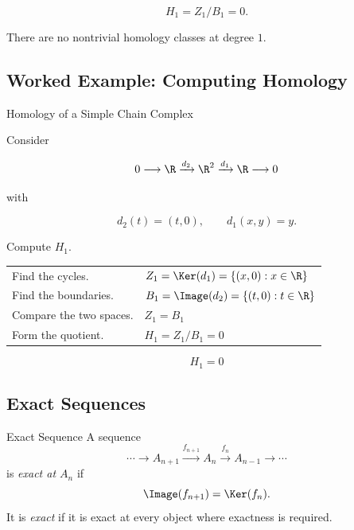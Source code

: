 \[ H_1=Z_1/B_1=0. \]

There are no nontrivial homology classes at degree \(1\).

\subsection{Worked Example: Computing Homology}
\label{subsec:worked-computing-homology}

\begin{workedexamplebox}{Homology of a Simple Chain Complex}

Consider

\[ 0\longrightarrow\R
\xrightarrow{d_2}\R^2
\xrightarrow{d_1}\R
\longrightarrow0 \]

with

\[ d_2(t)=(t,0),\qquad d_1(x,y)=y. \]

Compute \(H_1\).

\begin{tabularx}{\textwidth}{@{}>{\raggedright\arraybackslash}p{}X@{}}
Find the cycles. &
\(\displaystyle Z_1=\Ker(d_1)=\{(x,0):x\in\R\}\)\\
Find the boundaries. &
\(\displaystyle B_1=\Image(d_2)=\{(t,0):t\in\R\}\)\\
Compare the two spaces. & \(Z_1=B_1\)\\
Form the quotient. & \(H_1=Z_1/B_1=0\)
\end{tabularx}

\begin{answerbox}
\[ \boxed{H_1=0} \]
\end{answerbox}
\end{workedexamplebox}

\subsection{Exact Sequences}
\label{subsec:exact-sequences}

\begin{definitionbox}{Exact Sequence}
A sequence
\[ \cdots\longrightarrow A_{n+1}
\xrightarrow{f_{n+1}}A_n
\xrightarrow{f_n}A_{n-1}
\longrightarrow\cdots \]
is \emph{exact at \(A_n\)} if
\[ \Image(f_{n+1})=\Ker(f_n). \]
It is \emph{exact} if it is exact at every object where exactness is
required.
\end{definitionbox}

